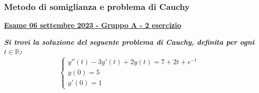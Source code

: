 \documentclass[a4paper]{article}
\newcommand{\definition}[1]{\textcolor{Red3}{\textbf{#1}}}
\newcommand{\example}[1]{\textcolor{Green4}{\textbf{#1}}}
\begin{document}
	\newpage

	\subsubsection{Metodo di somiglianza e problema di Cauchy}\label{subsubsection: metodo di somiglianza e problema di Cauchy}
	
	\begin{flushleft}
		\label{exam: esame 06 settembre 2023 - Gruppo A - 2 esercizio}
		\hypertarget{
			exam: esame 06 settembre 2023 - Gruppo A - 2 esercizio
		}{
			\definition{\underline{Esame 06 settembre 2023 - Gruppo A - 2 esercizio}}
		}
	\end{flushleft}
	\example{\emph{Si trovi la soluzione del seguente problema di Cauchy, definita per ogni $t \in \mathbb{R}$:}
	\begin{equation*}
		\begin{cases}
			y''\left(t\right) - 3y'\left(t\right) + 2y\left(t\right) = 7 + 2t + e^{-t} \\
			y\left(0\right) = 5 \\
			y'\left(0\right) = 1
		\end{cases}
	\end{equation*}}
\end{document}
